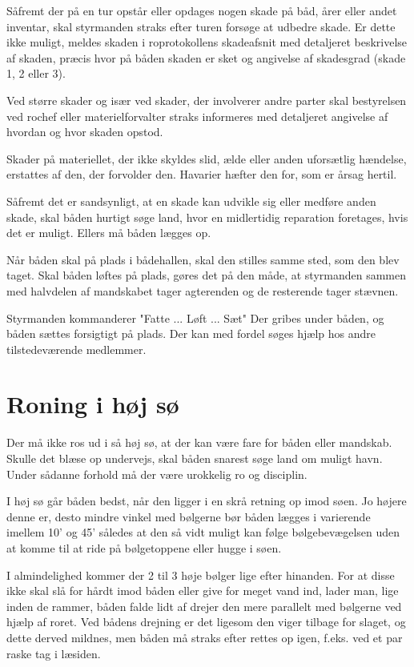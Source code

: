 \documentclass{article}
\begin{document}
Såfremt der på en tur opstår eller opdages nogen skade på båd, årer eller
andet inventar, skal styrmanden straks efter turen forsøge at udbedre
skade. Er dette ikke muligt, meldes skaden i roprotokollens skadeafsnit
med detaljeret beskrivelse af skaden, præcis hvor på båden skaden er sket
og angivelse af skadesgrad (skade 1, 2 eller 3).

Ved større skader og især ved skader, der involverer andre parter skal
bestyrelsen ved rochef eller materielforvalter straks informeres med
detaljeret angivelse af hvordan og hvor skaden opstod.

Skader på materiellet, der ikke skyldes slid, ælde eller anden uforsætlig
hændelse, erstattes af den, der forvolder den. Havarier hæfter den for,
som er årsag hertil.

Såfremt det er sandsynligt, at en skade kan udvikle sig eller medføre
anden skade, skal båden hurtigt søge land, hvor en midlertidig reparation
foretages, hvis det er muligt. Ellers må båden lægges op.

Når båden skal på plads i bådehallen, skal den stilles samme sted, som
den blev taget. Skal båden løftes på plads, gøres det på den måde, at
styrmanden sammen med halvdelen af mandskabet tager agterenden og de
resterende tager stævnen.

Styrmanden kommanderer "Fatte ... Løft ... Sæt" Der gribes under båden,
og båden sættes forsigtigt på plads. Der kan med fordel søges hjælp hos
andre tilstedeværende medlemmer.

\section{Roning i høj sø}

Der må ikke ros ud i så høj sø, at der kan være fare for båden eller
mandskab. Skulle det blæse op undervejs, skal båden snarest søge land om
muligt havn. Under sådanne forhold må der være urokkelig ro og disciplin.

I høj sø går båden bedst, når den ligger i en skrå retning op imod søen.
Jo højere denne er, desto mindre vinkel med bølgerne bør båden lægges i
varierende imellem 10' og 45' således at den så vidt muligt kan følge
bølgebevægelsen uden at komme til at ride på bølgetoppene eller hugge i
søen.

I almindelighed kommer der 2 til 3 høje bølger lige efter hinanden. For
at disse ikke skal slå for hårdt imod båden eller give for meget vand
ind, lader man, lige inden de rammer, båden falde lidt af drejer den mere
parallelt med bølgerne ved hjælp af roret. Ved bådens drejning er det
ligesom den viger tilbage for slaget, og dette derved mildnes, men båden
må straks efter rettes op igen, f.eks. ved et par raske tag i læsiden.
\end{document}
